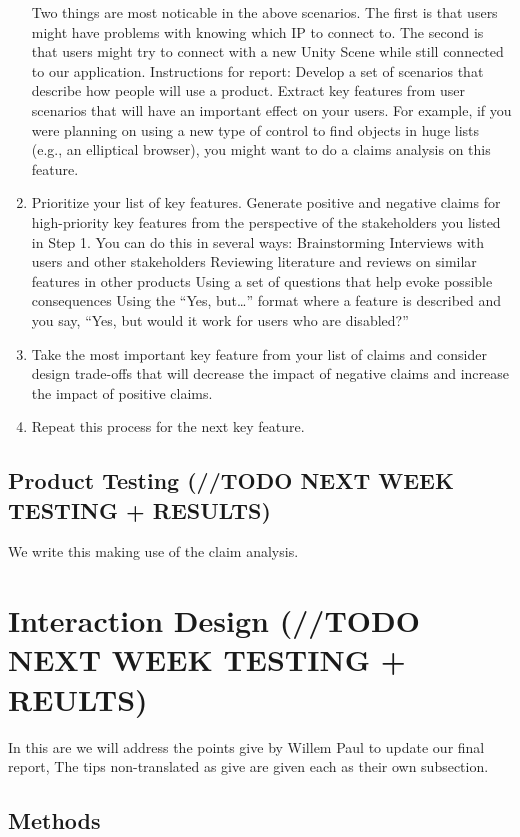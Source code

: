 \documentclass[11pt]{article}
\begin{document}
\begin{enumerate}
\begin{enumerate}
         \end{enumerate}
         Two things are most noticable in the above scenarios. The first is that users might have problems with knowing which IP to connect to. The second is that users might try to connect with a new Unity Scene while still connected to our application.
	Instructions for report:  
    Develop a set of scenarios that describe how people will use a product.  
		Extract key features from user scenarios that will have an important effect on your users. For example, if you were planning on using a new type of control to find 		objects in huge lists (e.g., an elliptical browser), you might want to do a claims analysis on this feature.\item Prioritize your list of key features.
		Generate positive and negative claims for high-priority key features from the perspective of the stakeholders you listed in Step 1. You can do this in several ways:
		Brainstorming
		Interviews with users and other stakeholders
		Reviewing literature and reviews on similar features in other products
		Using a set of questions that help evoke possible consequences
		Using the “Yes, but…” format where a feature is described and you say, “Yes, but would it work for users who are disabled?”

\item Take the most important key feature from your list of claims and consider design trade-offs that will decrease the impact of negative claims and increase the impact of positive claims.
\item Repeat this process for the next key feature.
\end{enumerate}

\subsection{Product Testing (//TODO NEXT WEEK TESTING + RESULTS)}
We write this making use of the claim analysis.

\section{Interaction Design (//TODO NEXT WEEK TESTING + REULTS)}
In this are we will address the points give by Willem Paul to update our final report, The tips non-translated as give are given each as their own subsection.


\subsection{Methods}
 
\end{document}
